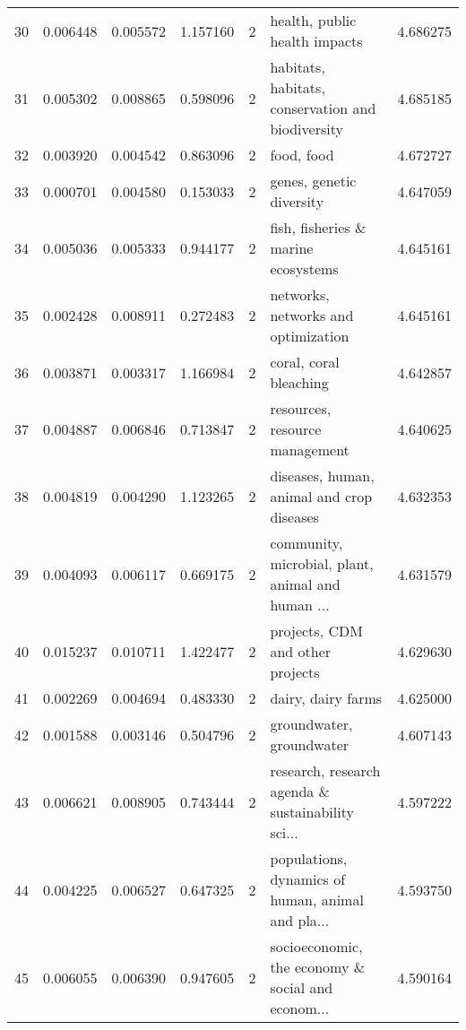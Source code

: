 \begin{tabular}{lrrrrlr}
30  &    0.006448 &  0.005572 &        1.157160 &           2 &                      health, public health impacts &  4.686275 \\
31  &    0.005302 &  0.008865 &        0.598096 &           2 &  habitats, habitats, conservation and biodiversity &  4.685185 \\
32  &    0.003920 &  0.004542 &        0.863096 &           2 &                                         food, food &  4.672727 \\
33  &    0.000701 &  0.004580 &        0.153033 &           2 &                           genes, genetic diversity &  4.647059 \\
34  &    0.005036 &  0.005333 &        0.944177 &           2 &                fish, fisheries \& marine ecosystems &  4.645161 \\
35  &    0.002428 &  0.008911 &        0.272483 &           2 &                networks, networks and optimization &  4.645161 \\
36  &    0.003871 &  0.003317 &        1.166984 &           2 &                             coral, coral bleaching &  4.642857 \\
37  &    0.004887 &  0.006846 &        0.713847 &           2 &                     resources, resource management &  4.640625 \\
38  &    0.004819 &  0.004290 &        1.123265 &           2 &          diseases, human, animal and crop diseases &  4.632353 \\
39  &    0.004093 &  0.006117 &        0.669175 &           2 &  community, microbial, plant, animal and human ... &  4.631579 \\
40  &    0.015237 &  0.010711 &        1.422477 &           2 &                   projects, CDM and other projects &  4.629630 \\
41  &    0.002269 &  0.004694 &        0.483330 &           2 &                                 dairy, dairy farms &  4.625000 \\
42  &    0.001588 &  0.003146 &        0.504796 &           2 &                           groundwater, groundwater &  4.607143 \\
43  &    0.006621 &  0.008905 &        0.743444 &           2 &  research, research agenda \& sustainability sci... &  4.597222 \\
44  &    0.004225 &  0.006527 &        0.647325 &           2 &  populations, dynamics of human, animal and pla... &  4.593750 \\
45  &    0.006055 &  0.006390 &        0.947605 &           2 &  socioeconomic, the economy \& social and econom... &  4.590164 \\

\end{tabular}
